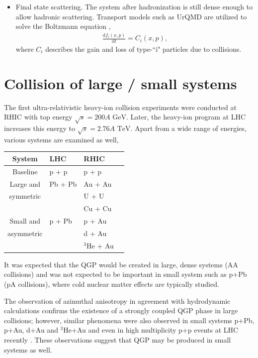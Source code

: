 \documentclass[aps,prl,twocolumn,groupedaddress]{revtex4-1}
\begin{document}
\begin{itemize}
		\item Final state scattering. 
		The system after hadronization is still dense enough to allow hadronic scattering. 
		Transport models such as UrQMD are utilized to solve the Boltzmann equation \citep{Bass:1998ca, Bleicher:1999xi},
		\begin{eqnarray}
			\frac{\mathrm{d}f_i(x, p)}{\mathrm{d}t} = C_i(x, p),
		\end{eqnarray}
	where $C_i$ describes the gain and loss of type-``i" particles due to collisions. 
	\end{itemize}
	


\section{Collision of large / small systems}
The first ultra-relativistic heavy-ion collision experiments were conducted at RHIC with top energy $\sqrt{s} = 200 A \textrm{ GeV}$. 
Later, the heavy-ion program at LHC increases this energy to $\sqrt{s} = 2.76 A \textrm{ TeV}$. 
Apart from a wide range of energies, various systems are examined as well,
\begin{center}
	\begin{tabularx}{0.5\textwidth}{c *{3}{Y}}
	\toprule[1pt]
	System 		& LHC 		 &	RHIC\\
	\midrule[0.5pt]
	Baseline	 	& p + p		 & 	 p + p \\
	\midrule[0.5pt]
	Large and		 	& Pb + Pb	 & 	 Au + Au \\
	symmetric		 	&			 & 	 U + U \\
			 	&			 & 	 Cu + Cu \\
	\midrule[0.5pt]
	Small and 	& p + Pb	 	 & 	 p + Au \\
	asymmetric		 	&			 & 	 d + Au \\
			 	&			 & 	 ${}^3$He + Au \\
	\bottomrule[1pt]
	\end{tabularx}
\end{center}
It was expected that the QGP would be created in large, dense systems (AA collisions) and was not expected to be important in small system such as p+Pb (pA collisions), where cold nuclear matter effects are typically studied.

The observation of azimuthal anisotropy in agreement with hydrodynamic calculations confirms the existence of a strongly coupled QGP phase in large collisions; however, similar phenomena were also observed in small systems p+Pb, p+Au, d+Au and ${}^3$He+Au and even in high multiplicity p+p events at LHC recently  \citep{Loizides:2016tew, Adare:2014keg, Adare:2015ctn, CMS:2015waa, ALICE:2014mda}. These observations suggest that QGP may be produced in small systems as well.
\end{document}
